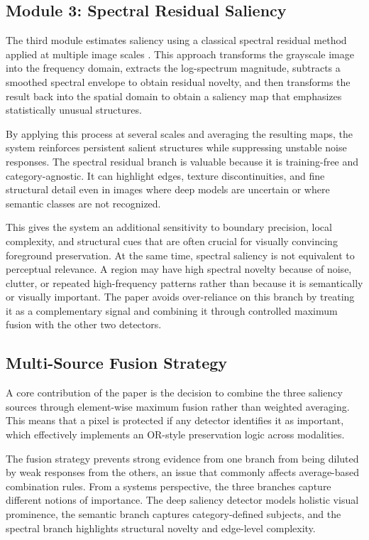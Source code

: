\documentclass[11pt,                                                             
 superscriptaddress,twoside,
 amsmath,amssymb,
 aps, physrev
]{revtex4-2}
\begin{document}
\subsection{Module 3: Spectral Residual Saliency}
The third module estimates saliency using a classical spectral residual method applied at multiple image scales \cite{hou2007ieee}. This approach transforms the grayscale image into the frequency domain, extracts the log-spectrum magnitude, subtracts a smoothed spectral envelope to obtain residual novelty, and then transforms the result back into the spatial domain to obtain a saliency map that emphasizes statistically unusual structures.

By applying this process at several scales and averaging the resulting maps, the system reinforces persistent salient structures while suppressing unstable noise responses. The spectral residual branch is valuable because it is training-free and category-agnostic. It can highlight edges, texture discontinuities, and fine structural detail even in images where deep models are uncertain or where semantic classes are not recognized.

This gives the system an additional sensitivity to boundary precision, local complexity, and structural cues that are often crucial for visually convincing foreground preservation. At the same time, spectral saliency is not equivalent to perceptual relevance. A region may have high spectral novelty because of noise, clutter, or repeated high-frequency patterns rather than because it is semantically or visually important. The paper avoids over-reliance on this branch by treating it as a complementary signal and combining it through controlled maximum fusion with the other two detectors.

\subsection{Multi-Source Fusion Strategy}
A core contribution of the paper is the decision to combine the three saliency sources through element-wise maximum fusion rather than weighted averaging. This means that a pixel is protected if any detector identifies it as important, which effectively implements an OR-style preservation logic across modalities.

The fusion strategy prevents strong evidence from one branch from being diluted by weak responses from the others, an issue that commonly affects average-based combination rules. From a systems perspective, the three branches capture different notions of importance. The deep saliency detector models holistic visual prominence, the semantic branch captures category-defined subjects, and the spectral branch highlights structural novelty and edge-level complexity.
\end{document}
